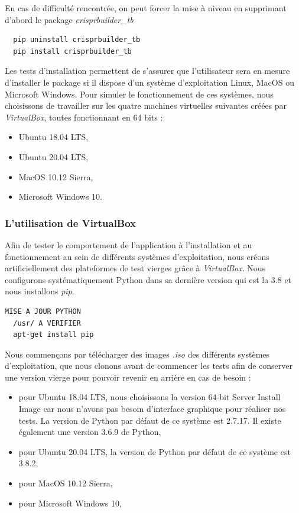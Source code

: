 \documentclass[twoside,a4paper,11pt,frenchb,openany]{report}
\begin{document}
En cas de difficulté rencontrée, on peut forcer la mise à niveau en supprimant d'abord le package \textit{crisprbuilder\_tb}
\begin{verbatim}
  pip uninstall crisprbuilder_tb
  pip install crisprbuilder_tb
\end{verbatim}

Les tests d'installation permettent de s'assurer que l'utilisateur sera en mesure d'installer le package si il dispose d'un système d'exploitation Linux, MacOS ou Microsoft Windows. Pour simuler le fonctionnement de ces systèmes, nous choisissons de travailler sur les quatre machines virtuelles suivantes créées par \textit{VirtualBox}, toutes fonctionnant en 64 bits : 
\begin{itemize}
\item Ubuntu 18.04 LTS, 
\item Ubuntu 20.04 LTS, 
\item MacOS 10.12 Sierra, 
\item Microsoft Windows 10.
\end{itemize}



\subsubsection{L'utilisation de VirtualBox}

Afin de tester le comportement de l'application à l'installation et au fonctionnement au sein de différents systèmes d'exploitation, nous créons artificiellement des plateformes de test vierges grâce à \textit{VirtualBox}. Nous configurons systématiquement Python dans sa dernière version qui est la 3.8 et nous installons \textit{pip}.

\begin{verbatim}
MISE A JOUR PYTHON
  /usr/ A VERIFIER
  apt-get install pip
\end{verbatim}

Nous commençons par télécharger des images \textit{.iso} des différents systèmes d'exploitation, que nous clonons avant de commencer les tests afin de conserver une version vierge pour pouvoir revenir en arrière en cas de besoin :
\begin{itemize}
\item pour Ubuntu 18.04 LTS, nous choisissons la version 64-bit Server Install Image car nous n'avons pas besoin d'interface graphique pour réaliser nos tests. La version de Python par défaut de ce système est 2.7.17. Il existe également une version 3.6.9 de Python,
\item pour Ubuntu 20.04 LTS, la version de Python par défaut de ce système est 3.8.2,
\item pour MacOS 10.12 Sierra, 
\item pour Microsoft Windows 10, 
\end{itemize}
\end{document}
